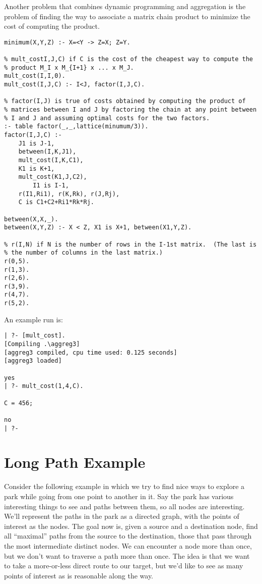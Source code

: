 Another problem that combines dynamic programming and aggregation is
the problem of finding the way to associate a matrix chain product to
minimize the cost of computing the product.
\begin{verbatim}
minimum(X,Y,Z) :- X=<Y -> Z=X; Z=Y.

% mult_costI,J,C) if C is the cost of the cheapest way to compute the
% product M_I x M_{I+1} x ... x M_J.
mult_cost(I,I,0).
mult_cost(I,J,C) :- I<J, factor(I,J,C).

% factor(I,J) is true of costs obtained by computing the product of
% matrices between I and J by factoring the chain at any point between
% I and J and assuming optimal costs for the two factors.
:- table factor(_,_,lattice(minumum/3)).
factor(I,J,C) :- 
	J1 is J-1,
	between(I,K,J1),
	mult_cost(I,K,C1),
	K1 is K+1,
	mult_cost(K1,J,C2),
        I1 is I-1,
	r(I1,Ri1), r(K,Rk), r(J,Rj),
	C is C1+C2+Ri1*Rk*Rj.

between(X,X,_).
between(X,Y,Z) :- X < Z, X1 is X+1, between(X1,Y,Z).

% r(I,N) if N is the number of rows in the I-1st matrix.  (The last is
% the number of columns in the last matrix.)
r(0,5).
r(1,3).
r(2,6).
r(3,9).
r(4,7).
r(5,2).
\end{verbatim}

An example run is:
\begin{verbatim}
| ?- [mult_cost].
[Compiling .\aggreg3]
[aggreg3 compiled, cpu time used: 0.125 seconds]
[aggreg3 loaded]

yes
| ?- mult_cost(1,4,C).

C = 456;

no
| ?- 
\end{verbatim}

\section{Long Path Example}

Consider the following example in which we try to find nice ways to
explore a park while going from one point to another in it.  Say the
park has various interesting things to see and paths between them, so
all nodes are interesting.  We'll represent the paths in the park as a
directed graph, with the points of interest as the nodes.  The goal
now is, given a source and a destination node, find all ``maximal''
paths from the source to the destination, those that pass through the
most intermediate distinct nodes.  We can encounter a node more than
once, but we don't want to traverse a path more than once.  The idea
is that we want to take a more-or-less direct route to our target, but
we'd like to see as many points of interest as is reasonable along the
way.

